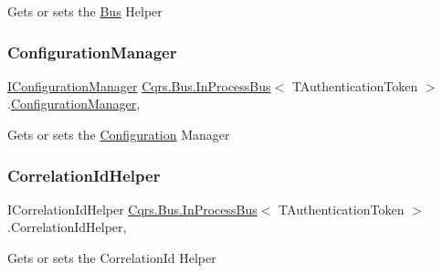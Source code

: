 Gets or sets the \hyperlink{namespaceCqrs_1_1Bus}{Bus} Helper 

\mbox{\label{classCqrs_1_1Bus_1_1InProcessBus_a403133ecfdbdfa85090366f1d5f95230_a403133ecfdbdfa85090366f1d5f95230}} 
\subsubsection{\texorpdfstring{Configuration\+Manager}{ConfigurationManager}}
{\footnotesize\ttfamily \hyperlink{interfaceCqrs_1_1Configuration_1_1IConfigurationManager}{I\+Configuration\+Manager} \hyperlink{classCqrs_1_1Bus_1_1InProcessBus}{Cqrs.\+Bus.\+In\+Process\+Bus}$<$ T\+Authentication\+Token $>$.\hyperlink{classCqrs_1_1Configuration_1_1ConfigurationManager}{Configuration\+Manager}\hspace{0.3cm}{\ttfamily [get]}, {\ttfamily [protected]}}



Gets or sets the \hyperlink{namespaceCqrs_1_1Configuration}{Configuration} Manager 

\mbox{\label{classCqrs_1_1Bus_1_1InProcessBus_a3ab05953af552331928ca0f1131c269d_a3ab05953af552331928ca0f1131c269d}} 
\subsubsection{\texorpdfstring{Correlation\+Id\+Helper}{CorrelationIdHelper}}
{\footnotesize\ttfamily I\+Correlation\+Id\+Helper \hyperlink{classCqrs_1_1Bus_1_1InProcessBus}{Cqrs.\+Bus.\+In\+Process\+Bus}$<$ T\+Authentication\+Token $>$.Correlation\+Id\+Helper\hspace{0.3cm}{\ttfamily [get]}, {\ttfamily [protected]}}



Gets or sets the Correlation\+Id Helper 

